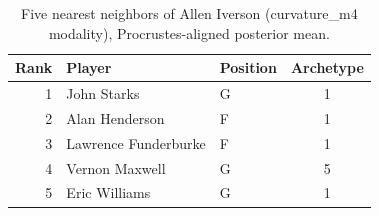\begin{table}[htbp]
  \centering\small
  \begin{tabular}{rllc}
    \toprule
    Rank & Player & Position & Archetype \\
    \midrule
    1 & John Starks & G & 1 \\
    2 & Alan Henderson & F & 1 \\
    3 & Lawrence Funderburke & F & 1 \\
    4 & Vernon Maxwell & G & 5 \\
    5 & Eric Williams & G & 1 \\
    \bottomrule
  \end{tabular}
  \caption{Five nearest neighbors of Allen Iverson (curvature_m4 modality), Procrustes-aligned posterior mean.}
  \label{tab:Allen_Iverson_neighbors_curvature_m4}
\end{table}

